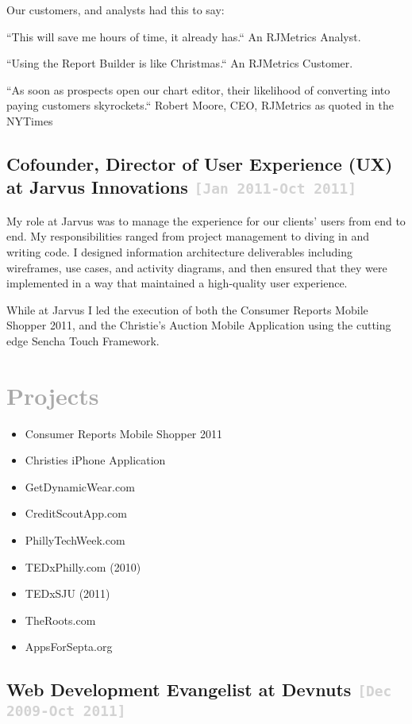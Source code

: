 \documentclass{tufte-handout}
\newcommand{\mhstandout}[1]{\textbf{\textcolor{DarkGray}{#1}}}
\newcommand{\shstandout}[1]{\textbf{\textcolor{BurntOrange}{#1}}}
\newcommand{\shyears}[1]{\small{\texttt{\textcolor{LightGray}{#1}}}}
\begin{document}
Our customers, and analysts had this to say:

``This will save me hours of time, it already has.``
An RJMetrics Analyst.

``Using the Report Builder is like Christmas.``
An RJMetrics Customer.

``As soon as prospects open our chart editor, their likelihood of converting into paying customers skyrockets.``
Robert Moore, CEO, RJMetrics as quoted in the NYTimes


\subsection{\textbf{Cofounder, Director of User Experience (UX)} at \shstandout{Jarvus Innovations} \shyears{[Jan 2011-Oct 2011]}}

My role at Jarvus was to manage the experience for our clients'​ users from end to end. My responsibilities ranged from project management to diving in and writing code. I designed information architecture deliverables including wireframes, use cases, and activity diagrams, and then ensured that they were implemented in a way that maintained a high-quality user experience.

While at Jarvus I led the execution of both the Consumer Reports Mobile Shopper 2011, and the Christie's Auction Mobile Application using the cutting edge Sencha Touch Framework.

\section{\mhstandout{Projects}}
\begin{itemize}
\itemsep-0.1em
\item{Consumer Reports Mobile Shopper 2011}
\item{Christies iPhone Application}
\item{GetDynamicWear.com}
\item{CreditScoutApp.com}
\item{PhillyTechWeek.com}
\item{TEDxPhilly.com (2010)}
\item{TEDxSJU (2011)}
\item{TheRoots.com}
\item{AppsForSepta.org}
\end{itemize}
\smallskip

\subsection{\textbf{Web Development Evangelist} at \shstandout{Devnuts} \shyears{[Dec 2009-Oct 2011]}}
\end{document}
